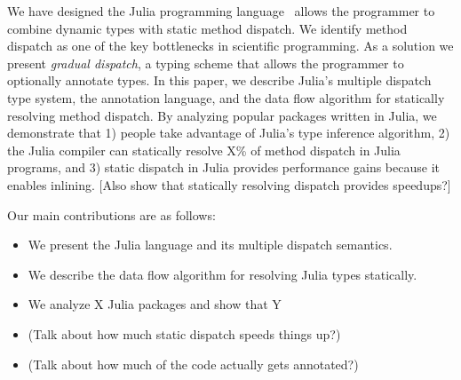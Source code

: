 We have designed the Julia programming language~\cite{Bezanson2012, Bezanson2014} allows the programmer to combine dynamic types with static method dispatch. We identify method dispatch as one of the key bottlenecks in scientific programming. As a solution we present \emph{gradual dispatch}, a typing scheme that allows the programmer to optionally annotate types. In this paper, we describe Julia's multiple dispatch type system, the annotation language, and the data flow algorithm for statically resolving method dispatch. By analyzing popular packages written in Julia, we demonstrate that 1) people take advantage of Julia's type inference algorithm, 2) the Julia compiler can statically resolve X\% of method dispatch in Julia programs, and 3) static dispatch in Julia provides performance gains because it enables inlining. [Also show that statically resolving dispatch provides speedups?]



Our main contributions are as follows:
\begin{itemize}
\item We present the Julia language and its multiple dispatch semantics.
\item We describe the data flow algorithm for resolving Julia types statically.
\item We analyze X Julia packages and show that Y%
\item (Talk about how much static dispatch speeds things up?)
\item (Talk about how much of the code actually gets annotated?)
\end{itemize}

